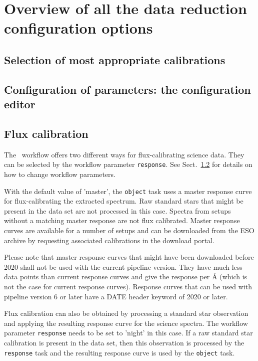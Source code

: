\section{Overview of all the data reduction configuration options}
\label{sec:configuretion_overview}

\subsection{Selection of most appropriate calibrations}



\subsection{Configuration of parameters: the configuration editor}
\label{sec:configuration_editor}



\subsection{Flux calibration}
\label{sect:flux_calibration}

The \instname\ workflow offers two different ways for flux-calibrating science data.
They can be selected by the
workflow parameter {\tt response}. See Sect.~\ref{sec:configuration_editor} for details
on how to change workflow parameters.

With the default value of 'master', the {\tt object} task uses a master response curve
for flux-calibrating the extracted spectrum. 
Raw standard stars that might
be present in the data set are not processed in this case. 
Spectra from setups without a matching master response are not
flux calibrated.
Master response curves are available for a number of setups and can be downloaded from the ESO
archive by requesting associated calibrations in the download portal.

Please note that master response curves that might have been downloaded before 2020 
shall not be used with the current pipeline version. They have much less data points than current
response curves and give the response per {\AA} (which is not the case for current response curves).
Response curves that can be used with pipeline version 6 or later have a DATE header keyword of
2020 or later.

Flux calibration can also be obtained by processing a standard star observation and applying the
resulting response curve for the science spectra. The workflow parameter {\tt response} needs to be
set to 'night' in this case. 
If a raw standard star calibration is present in the data set,
then this observation is processed by the {\tt response} task and the resulting response curve is 
used by the {\tt object} task. 

